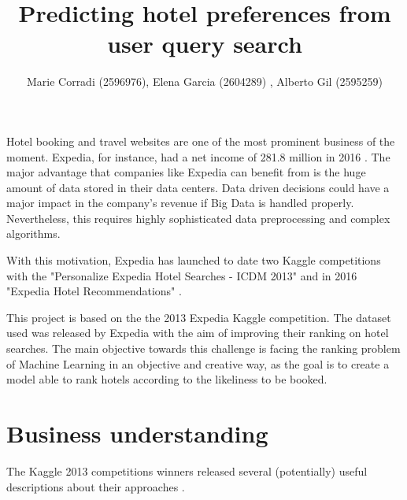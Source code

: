 \documentclass[9pt]{llncs}
\begin{document}
\title{Predicting hotel preferences from user query search}%
\author{Marie Corradi (2596976), Elena Garcia (2604289) , Alberto Gil (2595259)}
\maketitle

Hotel booking and travel websites are one of the most prominent business of the moment. Expedia, for instance, had a net income of 281.8 million in 2016 \cite{2017ExpediaResults}. 
The major advantage that companies like Expedia can benefit from is the huge amount of data stored in their data centers. Data driven decisions could have a major impact in the company's revenue if Big Data is handled properly. Nevertheless, this requires highly sophisticated data preprocessing and complex algorithms.


With this motivation, Expedia has launched to date two Kaggle competitions with the 
"Personalize Expedia Hotel Searches - ICDM 2013" \cite{ExpediaHttps://www.kaggle.com/c/expedia-personalized-sort} and in 2016 "Expedia Hotel Recommendations" \cite{ExpediaHttps://www.kaggle.com/c/expedia-hotel-recommendations}.


This project is based on the the 2013 Expedia Kaggle competition. The dataset used was released by Expedia with the aim of improving their ranking on hotel searches. The main objective towards this challenge is facing the ranking problem of Machine Learning \cite{Liu2007LearningRetrieval} in an objective and creative way, as the goal is to create a model able to rank hotels according to the likeliness to be booked. 


\section{Business understanding}
The Kaggle 2013 competitions winners released several (potentially) useful descriptions about their approaches \cite{ExpediaHttps://www.kaggle.com/c/expedia-personalized-sort/discussion/6203}. 
\end{document}

